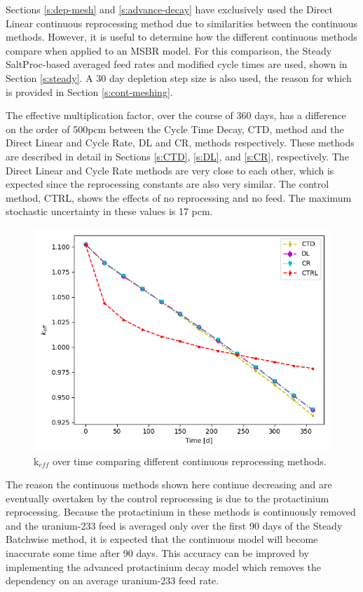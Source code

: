 Sections \ref{s:dep-mesh} and \ref{s:advance-decay} have exclusively used the Direct Linear continuous reprocessing method due to similarities between the continuous methods.
However, it is useful to determine how the different continuous methods compare when applied to an MSBR model.
For this comparison, the Steady SaltProc-based averaged feed rates and modified cycle times are used, shown in Section \ref{s:steady}.
A 30 day depletion step size is also used, the reason for which is provided in Section \ref{s:cont-meshing}.


The effective multiplication factor, over the course of 360 days, has a difference on the order of 500pcm between the Cycle Time Decay, CTD, method and the Direct Linear and Cycle Rate, DL and CR, methods respectively.
These methods are described in detail in Sections \ref{s:CTD}, \ref{s:DL}, and \ref{s:CR}, respectively.
The Direct Linear and Cycle Rate methods are very close to each other, which is expected since the reprocessing constants are also very similar. The control method, CTRL, shows the effects of no reprocessing and no feed.
The maximum stochastic uncertainty in these values is 17 pcm.

\begin{figure}[H]
  \centering
  \includegraphics[scale=0.7]{images/cont-compare-keff-1.png}
  \caption{k$_{eff}$ over time comparing different continuous reprocessing methods.}
   \label{fig:continuous-compare}
\end{figure}

The reason the continuous methods shown here continue decreasing and are eventually overtaken by the control reprocessing is due to the protactinium reprocessing. Because the protactinium in these methods is continuously removed and the uranium-233 feed is averaged only over the first 90 days of the Steady Batchwise method, it is expected that the continuous model will become inaccurate some time after 90 days. This accuracy can be improved by implementing the advanced protactinium decay model which removes the dependency on an average uranium-233 feed rate.

